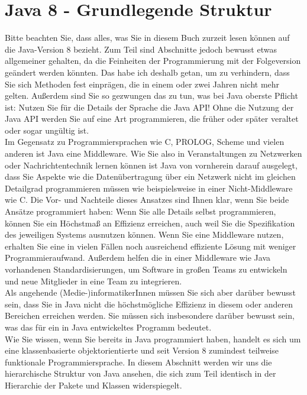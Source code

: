 \section{Java 8 - Grundlegende Struktur}

Bitte beachten Sie, dass alles, was Sie in diesem Buch zurzeit lesen können auf die Java-Version 8 bezieht. Zum Teil sind Abschnitte jedoch bewusst etwas allgemeiner gehalten, da die Feinheiten der Programmierung mit der Folgeversion geändert werden könnten. Das habe ich deshalb getan, um zu verhindern, dass Sie sich Methoden fest einprägen, die in einem oder zwei Jahren nicht mehr gelten. Außerdem sind Sie so gezwungen das zu tun, was bei Java oberste Pflicht ist: Nutzen Sie für die Details der Sprache die Java API! Ohne die Nutzung der Java API werden Sie auf eine Art programmieren, die früher oder später veraltet oder sogar ungültig ist.\\

Im Gegensatz zu Programmiersprachen wie C, PROLOG, Scheme und vielen anderen ist Java eine Middleware. Wie Sie also in Veranstaltungen zu Netzwerken oder Nachrichtentechnik lernen können ist Java von vornherein darauf ausgelegt, dass Sie Aspekte wie die Datenübertragung über ein Netzwerk nicht im gleichen Detailgrad programmieren müssen wie beispielsweise in einer Nicht-Middleware wie C. Die Vor- und Nachteile dieses Ansatzes sind Ihnen klar, wenn Sie beide Ansätze programmiert haben: Wenn Sie alle Details selbst programmieren, können Sie ein Höchstmaß an Effizienz erreichen, auch weil Sie die Spezifikation des jeweiligen Systems ausnutzen können. Wenn Sie eine Middleware nutzen, erhalten Sie eine in vielen Fällen noch ausreichend effiziente Lösung mit weniger Programmieraufwand. Außerdem helfen die in einer Middleware wie Java vorhandenen Standardisierungen, um Software in großen Teams zu entwickeln und neue Mitglieder in eine Team zu integrieren.\\


Als angehende (Medie-)informatikerInnen müssen Sie sich aber darüber bewusst sein, dass Sie in Java nicht die höchstmögliche Effizienz in diesem oder anderen Bereichen erreichen werden. Sie müssen sich insbesondere darüber bewusst sein, was das für ein in Java entwickeltes Programm bedeutet.\\

Wie Sie wissen, wenn Sie bereits in Java programmiert haben, handelt es sich um eine klassenbasierte objektorientierte und seit Version 8 zumindest teilweise funktionale Programmiersprache. In diesem Abschnitt werden wir uns die hierarchische Struktur von Java ansehen, die sich zum Teil identisch in der Hierarchie der Pakete und Klassen widerspiegelt.\\


